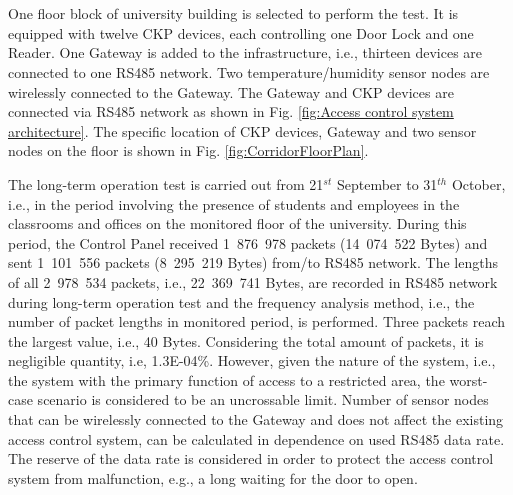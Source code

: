 \DIFdelbegin \section{}
\addtocounter{section}{-1}%
\DIFdelend \DIFaddbegin \chapter{}
\DIFaddend %
One floor block of university building is selected to perform the test. It is equipped with twelve CKP devices, each controlling one Door Lock and one Reader. One Gateway is added to the infrastructure, i.e., thirteen devices are connected to one RS485 network. Two temperature/humidity sensor nodes are wirelessly connected to the Gateway. The Gateway and CKP devices are connected via RS485 network as shown in Fig. \ref{fig:Access control system architecture}. The specific location of CKP devices, Gateway and two sensor nodes on the floor is shown in Fig. \ref{fig:CorridorFloorPlan}.


The long-term operation test is carried out from 21$^{st}$ September to 31$^{th}$ October, i.e., in the period involving the presence of students and employees in the classrooms and offices on the monitored floor of the university.
During this period, the Control Panel received 1~876~978 packets (14~074~522 Bytes) and sent 1~101~556 packets (8~295~219 Bytes) from/to RS485 network. 
The lengths of all 2~978~534 packets, i.e., 22~369~741 Bytes, are recorded in RS485 network during long-term operation test and the frequency analysis  method, i.e., the number of packet lengths in monitored period, is performed. Three packets reach the largest value, i.e., 40 Bytes. 
Considering the total amount of packets, it is negligible quantity, i.e, 1.3E-04\%. However, given the nature of the system, i.e., the system with the primary function of access to a restricted area, the worst-case scenario is considered to be an uncrossable limit. 
Number of sensor nodes that can be wirelessly connected to the Gateway and does not affect the existing access control system, can be calculated in dependence on used RS485 data rate. The reserve of the data rate is considered in order to protect the access control system from malfunction, e.g., a long waiting for the door to open.

